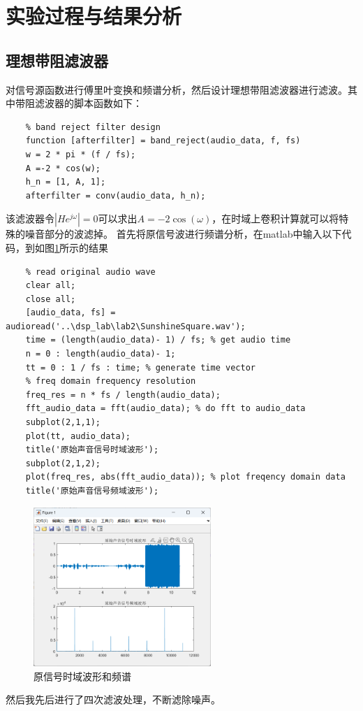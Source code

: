 \documentclass[UTF8]{ctexart}
\begin{document}
\section{实验过程与结果分析}
\subsection{理想带阻滤波器}
对信号源函数进行傅里叶变换和频谱分析，然后设计理想带阻滤波器进行滤波。其中带阻滤波器的脚本函数如下：
\begin{verbatim}
    % band reject filter design
    function [afterfilter] = band_reject(audio_data, f, fs)
    w = 2 * pi * (f / fs);
    A =-2 * cos(w);
    h_n = [1, A, 1];
    afterfilter = conv(audio_data, h_n);
\end{verbatim}
该滤波器令$|H{e^{j\omega}}|=0$可以求出$A=-2\cos(\omega)$，在时域上卷积计算就可以将特殊的噪音部分的波滤掉。
首先将原信号波进行频谱分析，在matlab中输入以下代码，到如图\ref{img:1}所示的结果
\begin{verbatim}
    % read original audio wave
    clear all;
    close all;
    [audio_data, fs] = audioread('..\dsp_lab\lab2\SunshineSquare.wav');
    time = (length(audio_data)- 1) / fs; % get audio time
    n = 0 : length(audio_data)- 1;
    tt = 0 : 1 / fs : time; % generate time vector
    % freq domain frequency resolution
    freq_res = n * fs / length(audio_data);
    fft_audio_data = fft(audio_data); % do fft to audio_data
    subplot(2,1,1);
    plot(tt, audio_data);
    title('原始声音信号时域波形');
    subplot(2,1,2);
    plot(freq_res, abs(fft_audio_data)); % plot freqency domain data
    title('原始声音信号频域波形');
\end{verbatim}
\begin{figure}[htbp]
    \centering
    \includegraphics[width=0.6\textwidth]{1.png}
    \caption{原信号时域波形和频谱}
    \label{img:1}
\end{figure}
然后我先后进行了四次滤波处理，不断滤除噪声。
\end{document}
